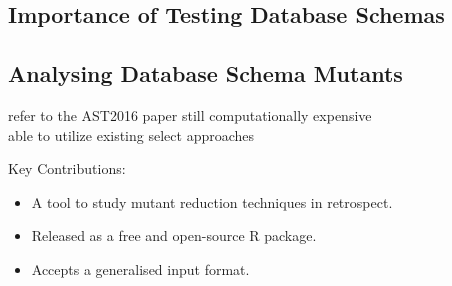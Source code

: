 %
%
%

\subsection{Importance of Testing Database Schemas}
\subsection{Analysing Database Schema Mutants}
refer to the AST2016 paper
still computationally expensive\\
able to utilize existing select approaches

    Key Contributions:
    \begin{itemize}
        \item A tool to study mutant reduction techniques in retrospect.
        \item Released as a free and open-source R package.
        \item Accepts a generalised input format.
    \end{itemize}
